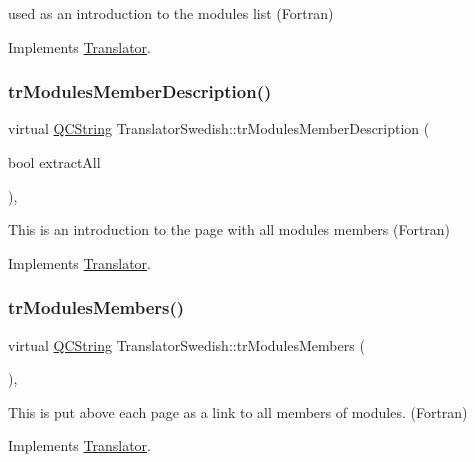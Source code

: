 used as an introduction to the modules list (Fortran) 

Implements \mbox{\hyperlink{class_translator}{Translator}}.

\mbox{\label{class_translator_swedish_aa85dc0feb681133b4592cad3c90720b9}} 
\subsubsection{\texorpdfstring{trModulesMemberDescription()}{trModulesMemberDescription()}}
{\footnotesize\ttfamily virtual \mbox{\hyperlink{class_q_c_string}{Q\+C\+String}} Translator\+Swedish\+::tr\+Modules\+Member\+Description (\begin{DoxyParamCaption}\item[{bool}]{extract\+All }\end{DoxyParamCaption})\hspace{0.3cm}{\ttfamily [inline]}, {\ttfamily [virtual]}}

This is an introduction to the page with all modules members (Fortran) 

Implements \mbox{\hyperlink{class_translator}{Translator}}.

\mbox{\label{class_translator_swedish_ac558b9172dae70014081872abeb0424a}} 
\subsubsection{\texorpdfstring{trModulesMembers()}{trModulesMembers()}}
{\footnotesize\ttfamily virtual \mbox{\hyperlink{class_q_c_string}{Q\+C\+String}} Translator\+Swedish\+::tr\+Modules\+Members (\begin{DoxyParamCaption}{ }\end{DoxyParamCaption})\hspace{0.3cm}{\ttfamily [inline]}, {\ttfamily [virtual]}}

This is put above each page as a link to all members of modules. (Fortran) 

Implements \mbox{\hyperlink{class_translator}{Translator}}.

